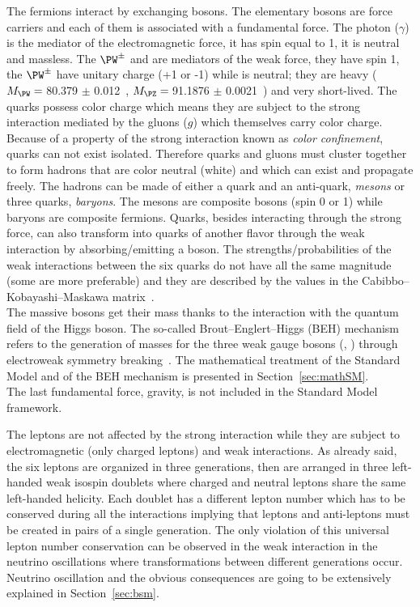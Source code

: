The fermions interact by exchanging bosons. The elementary bosons are force carriers and each of them is associated with a fundamental force. The photon ($\gamma$) is the mediator of the electromagnetic force, it has spin equal to 1, it is neutral and massless. The $\PW^{\pm}$ and \PZ are mediators of the weak force, they have spin 1, the $\PW^{\pm}$ have unitary charge (+1 or -1) while \PZ is neutral; they are heavy ($M_\PW =\:$80.379 $\pm$ 0.012\GeV~\cite{pdgw}, $M_\PZ =\:$91.1876 $\pm$ 0.0021\GeV~\cite{pdgz}) and very short-lived. The quarks possess color charge which means they are subject to the strong interaction mediated by the gluons ($g$) which themselves carry color charge. Because of a property of the strong interaction known as \emph{color confinement}, quarks can not exist isolated. Therefore quarks and gluons must cluster together to form hadrons that are color neutral (white) and which can exist and propagate freely. The hadrons can be made of either a quark and an anti-quark, \emph{mesons} or three quarks, \emph{baryons}. The mesons are composite bosons (spin 0 or 1) while baryons are composite fermions. Quarks, besides interacting through the strong force, can also transform into quarks of another flavor through the weak interaction by absorbing/emitting a \PW boson. The strengths/probabilities of the weak interactions between the six quarks do not have all the same magnitude (some are more preferable) and they are described by the values in the Cabibbo–Kobayashi–Maskawa matrix~\cite{10.1143/PTP.28.870}.\\
The massive bosons get their mass thanks to the interaction with the quantum field of the Higgs boson. The so-called Brout–Englert–Higgs (BEH) mechanism refers to the generation of masses for the three weak gauge bosons (\PW, \PZ) through electroweak symmetry breaking~\cite{PhysRevLett.13.321,PhysRevLett.13.508}. The mathematical treatment of the Standard Model and of the BEH mechanism is presented in Section~\ref{sec:mathSM}.\\
The last fundamental force, gravity, is not included in the Standard Model framework. 

The leptons are not affected by the strong interaction while they are subject to electromagnetic (only charged leptons) and weak interactions. As already said, the six leptons are organized in three generations, then are arranged in three left-handed weak isospin doublets where charged and neutral leptons share the same left-handed helicity. Each doublet has a different lepton number which has to be conserved during all the interactions implying that leptons and anti-leptons must be created in pairs of a single generation. The only violation of this universal lepton number conservation can be observed in the weak interaction in the neutrino oscillations where transformations between different generations occur. Neutrino oscillation and the obvious consequences are going to be extensively explained in Section~\ref{sec:bsm}. 

